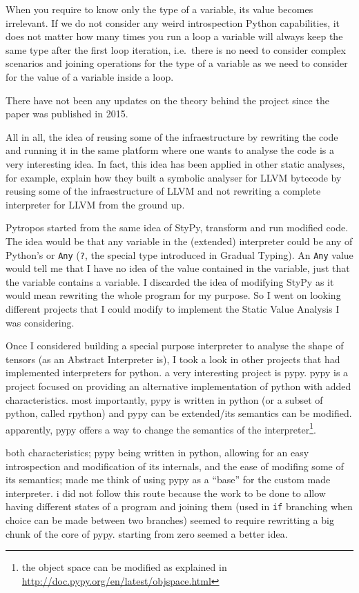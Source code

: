When you require to know only the type of a variable, its value becomes
irrelevant. If we do not consider any weird introspection Python
capabilities, it does not matter how many times you run a loop a
variable will always keep the same type after the first loop iteration,
i.e.~there is no need to consider complex scenarios and joining
operations for the type of a variable as we need to consider for the
value of a variable inside a loop.

There have not been any updates on the theory behind the project since
the paper was published in 2015.

All in all, the idea of reusing some of the infraestructure by rewriting
the code and running it in the same platform where one wants to analyse
the code is a very interesting idea. In fact, this idea has been applied
in other static analyses, for example, \textcite{lauko_symbolic_2018}
explain how they built a symbolic analyser for LLVM bytecode by reusing
some of the infraestructure of LLVM and not rewriting a complete
interpreter for LLVM from the ground up.

Pytropos started from the same idea of StyPy, transform and run modified
code. The idea would be that any variable in the (extended) interpreter
could be any of Python's or \texttt{Any} (\texttt{?}, the special type
introduced in Gradual Typing). An \texttt{Any} value would tell me that
I have no idea of the value contained in the variable, just that the
variable contains a variable. I discarded the idea of modifying StyPy as
it would mean rewriting the whole program for my purpose. So I went on
looking different projects that I could modify to implement the Static
Value Analysis I was considering.

{}

Once I considered building a special purpose interpreter to analyse the
shape of tensors (as an Abstract Interpreter is), I took a look in other
projects that had implemented interpreters for python. a very
interesting project is pypy. pypy \autocite{krekel_pypy_2007} is a
project focused on providing an alternative implementation of python
with added characteristics. most importantly, pypy is written in python
(or a subset of python, called rpython) and pypy can be extended/its
semantics can be modified. apparently, pypy offers a way to change the
semantics of the interpreter\footnote{the object space can be modified
  as explained in \url{http://doc.pypy.org/en/latest/objspace.html}}.

both characteristics; pypy being written in python, allowing for an easy
introspection and modification of its internals, and the ease of
modifing some of its semantics; made me think of using pypy as a
\enquote{base} for the custom made interpreter. i did not follow this
route because the work to be done to allow having different states of a
program and joining them (used in \texttt{if} branching when choice can
be made between two branches) seemed to require rewritting a big chunk
of the core of pypy. starting from zero seemed a better idea.

